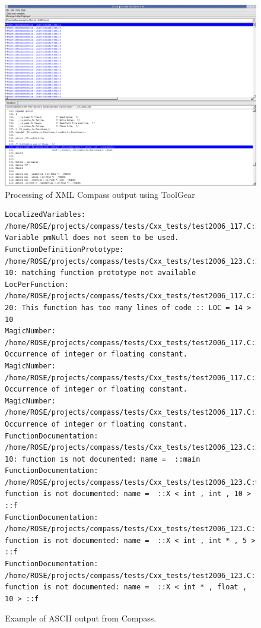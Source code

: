\begin{figure}
\includegraphics[width=7in]{ToolGear_gui_compass_01.pdf}
\caption{Processing of XML Compass output using ToolGear}
\label{Compass_ToolGear_Screenshot}
\end{figure}

\begin{figure}
{\scriptsize
\begin{verbatim}
LocalizedVariables: /home/ROSE/projects/compass/tests/Cxx_tests/test2006_117.C:30.5: Variable pmNull does not seem to be used.
FunctionDefinitionPrototype: /home/ROSE/projects/compass/tests/Cxx_tests/test2006_123.C:27.1-10: matching function prototype not available
LocPerFunction: /home/ROSE/projects/compass/tests/Cxx_tests/test2006_117.C:23.1-20: This function has too many lines of code :: LOC = 14 > 10
MagicNumber: /home/ROSE/projects/compass/tests/Cxx_tests/test2006_117.C:33.14: Occurrence of integer or floating constant.
MagicNumber: /home/ROSE/projects/compass/tests/Cxx_tests/test2006_117.C:36.14: Occurrence of integer or floating constant.
MagicNumber: /home/ROSE/projects/compass/tests/Cxx_tests/test2006_117.C:37.14: Occurrence of integer or floating constant.
FunctionDocumentation: /home/ROSE/projects/compass/tests/Cxx_tests/test2006_123.C:27.1-10: function is not documented: name =  ::main
FunctionDocumentation: /home/ROSE/projects/compass/tests/Cxx_tests/test2006_123.C:9.10: function is not documented: name =  ::X < int , int , 10 > ::f
FunctionDocumentation: /home/ROSE/projects/compass/tests/Cxx_tests/test2006_123.C:12.10: function is not documented: name =  ::X < int , int * , 5 > ::f
FunctionDocumentation: /home/ROSE/projects/compass/tests/Cxx_tests/test2006_123.C:16.10: function is not documented: name =  ::X < int * , float , 10 > ::f
\end{verbatim}
}
\caption{Example of ASCII output from Compass. }
\label{Compass_ASCII_Output}
\end{figure}



